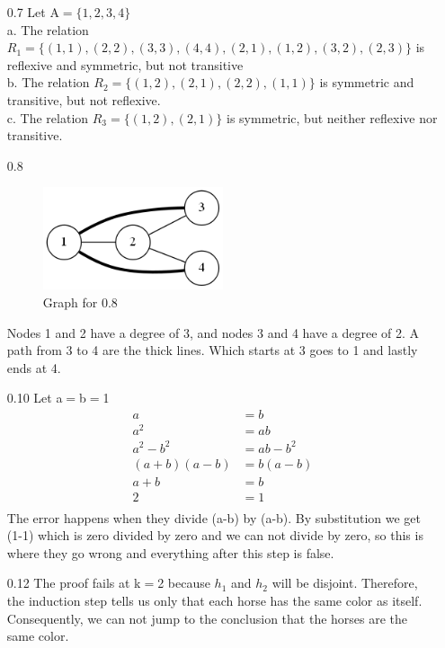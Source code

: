\documentclass[10pt] {article}
\begin{document}
\begin{enumerate}
\item[0.7] Let A$= \{1,2,3,4 \}$\\
a. The relation $R_1= \{(1,1),(2,2),(3,3),(4,4),(2,1),(1,2),(3,2),(2,3) \}$ is reflexive and symmetric, but not transitive\\
b. The relation $R_2= \{ (1,2),(2,1),(2,2),(1,1) \}$ is symmetric and transitive, but not reflexive. \\
c. The relation $R_3= \{ (1,2),(2,1) \}$ is symmetric, but neither reflexive nor transitive.
\item[0.8]
 \begin{figure}
\includegraphics[width=0.5\textwidth]{8.png}
\caption{Graph for 0.8}
\label{8}
\end{figure} 
Nodes 1 and 2 have a degree of 3, and nodes 3 and 4 have a degree of 2. A path from 3 to 4 are the thick lines. Which starts at 3 goes to 1 and lastly ends at 4. 
\item[0.10]Let a$=$b$=$1
\begin{align*}
a&=b\\
a^{2}&=ab\\
a^{2}-b^{2}&=ab-b^{2}\\
(a+b)(a-b)&=b(a-b)\\
a+b&=b\\
2&=1\\
\end{align*}
The error happens when they divide (a-b) by (a-b). By substitution we get (1-1) which is zero divided by zero and we can not divide by zero, so this is where they go wrong and everything after this step is false.
\item[0.12] The proof fails at k$=$2 because $h_1$ and $h_2$ will be disjoint. Therefore, the induction step tells us only that each horse has the same color as itself. Consequently, we can not jump to the conclusion that the horses are the same color.
\end{enumerate}
\end{document}
